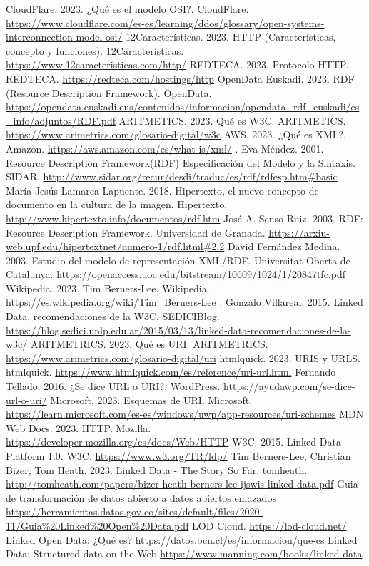 \documentclass[11pt]{report}
\begin{document}
\begin{thebibliography}{99}
	 CloudFlare. 2023.  ¿Qué es el modelo OSI?.  CloudFlare.  \url{https://www.cloudflare.com/es-es/learning/ddos/glossary/open-systems-interconnection-model-osi/}
	 12Características. 2023. HTTP (Características, concepto y funciones). 12Características. \url{https://www.12caracteristicas.com/http/}
	 REDTECA. 2023. Protocolo HTTP. REDTECA. \url{https://redteca.com/hostings/http}
	OpenData Euskadi. 2023. RDF (Resource Description Framework). OpenData. \url{https://opendata.euskadi.eus/contenidos/informacion/opendata_rdf_euskadi/es_info/adjuntos/RDF.pdf}
	 ARITMETICS. 2023. Qué es W3C. ARITMETICS. \url{https://www.arimetrics.com/glosario-digital/w3c}
	 AWS. 2023. ¿Qué es XML?. Amazon. \url{https://aws.amazon.com/es/what-is/xml/}
	.  Eva Méndez. 2001. Resource Description Framework(RDF)	Especificación del Modelo y la Sintaxis. SIDAR. \url{http://www.sidar.org/recur/desdi/traduc/es/rdf/rdfesp.htm#basic}
	 María Jesús Lamarca Lapuente. 2018. Hipertexto, el nuevo concepto de documento en la cultura de la imagen. Hipertexto. \url{http://www.hipertexto.info/documentos/rdf.htm}
	 José A. Senso Ruiz. 2003. RDF: Resource Description Framework. Universidad de Granada. \url{https://arxiu-web.upf.edu/hipertextnet/numero-1/rdf.html#2.2}
	 David Fernández Medina. 2003. Estudio del modelo de representación XML/RDF. Universitat Oberta de Catalunya. \url{https://openaccess.uoc.edu/bitstream/10609/1024/1/20847tfc.pdf}
	 Wikipedia. 2023. Tim Berners-Lee. Wikipedia. \url{https://es.wikipedia.org/wiki/Tim_Berners-Lee}
	. Gonzalo Villareal. 2015. Linked Data, recomendaciones de la W3C. SEDICIBlog. \url{https://blog.sedici.unlp.edu.ar/2015/03/13/linked-data-recomendaciones-de-la-w3c/}
	 ARITMETRICS. 2023. Qué es URI. ARITMETRICS. \url{https://www.arimetrics.com/glosario-digital/uri}
	 htmlquick. 2023. URIS y URLS. htmlquick. \url{https://www.htmlquick.com/es/reference/uri-url.html}
	 Fernando Tellado. 2016. ¿Se dice URL o URI?. WordPress. \url{https://ayudawp.com/se-dice-url-o-uri/}
	 Microsoft. 2023. Esquemas de URI. Microsoft. \url{https://learn.microsoft.com/es-es/windows/uwp/app-resources/uri-schemes}
	 MDN Web Docs. 2023. HTTP. Mozilla. \url{https://developer.mozilla.org/es/docs/Web/HTTP}
	 W3C. 2015. Linked Data Platform 1.0. W3C. \url{https://www.w3.org/TR/ldp/}
	 Tim Berners-Lee, Christian Bizer, Tom Heath. 2023. Linked Data - The Story So Far. tomheath. \url{http://tomheath.com/papers/bizer-heath-berners-lee-ijswis-linked-data.pdf}
	 Guia de transformación de datos abierto a datos abiertos enlazados \url{https://herramientas.datos.gov.co/sites/default/files/2020-11/Guia%20Linked%20Open%20Data.pdf}
	 LOD Cloud. \url{https://lod-cloud.net/}
	 Linked Open Data: ¿Qué es?	\url{https://datos.bcn.cl/es/informacion/que-es}
	 Linked Data: Structured data on the Web \url{https://www.manning.com/books/linked-data}
\end{thebibliography}
\end{document}
